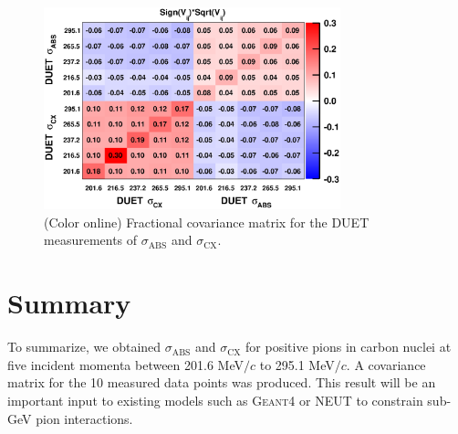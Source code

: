 \begin{figure}[h]
\begin{center}
\includegraphics[width=86mm]{figures/duet_fractional_covariance_forpaper_v3.eps}
\caption{(Color online) Fractional covariance matrix for the DUET measurements of $\sigma_{\mathrm{ABS}}$ and $\sigma_{\mathrm{CX}}$. }
\label{fig:covariance}
\end{center} 
\end{figure}

\section{Summary}
To summarize, we obtained $\sigma_{\mathrm{ABS}}$ and $\sigma_{\mathrm{CX}}$ for positive pions in carbon nuclei at five incident momenta between 201.6 MeV$/c$ to 295.1 MeV$/c$. A covariance matrix for the 10 measured data points was produced. This result will be an important input to existing models such as \textsc{Geant4} or \textsc{NEUT} to constrain sub-GeV pion interactions.
